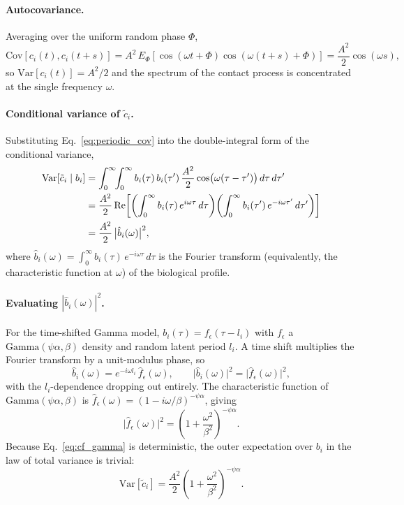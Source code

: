 \paragraph{Autocovariance.} Averaging over the uniform random phase $\Phi$,
%
\begin{equation}
	\text{Cov}[c_i(t), c_i(t+s)] = A^2\,E_\Phi[\cos(\omega t + \Phi)\cos(\omega(t+s) + \Phi)] = \frac{A^2}{2}\cos(\omega s),
	\label{eq:periodic_cov}
\end{equation}
%
so $\text{Var}[c_i(t)] = A^2/2$ and the spectrum of the contact process is concentrated at the single frequency $\omega$.

\paragraph{Conditional variance of $\tilde{c}_i$.} Substituting Eq.~\ref{eq:periodic_cov} into the double-integral form of the conditional variance,
%
\begin{align}
	\text{Var}[\tilde{c}_i \mid b_i]
	&= \int_0^\infty\!\!\int_0^\infty b_i(\tau)\,b_i(\tau')\,\frac{A^2}{2}\cos\bigl(\omega(\tau - \tau')\bigr)\,d\tau\,d\tau' \notag\\
	&= \frac{A^2}{2}\,\text{Re}\!\left[\left(\int_0^\infty b_i(\tau)\,e^{i\omega\tau}\,d\tau\right)\!\left(\int_0^\infty b_i(\tau')\,e^{-i\omega\tau'}\,d\tau'\right)\right] \notag\\
	&= \frac{A^2}{2}\,\bigl|\hat{b}_i(\omega)\bigr|^2,
	\label{eq:var_cond}
\end{align}
%
where $\hat{b}_i(\omega) = \int_0^\infty b_i(\tau)\,e^{-i\omega\tau}\,d\tau$ is the Fourier transform (equivalently, the characteristic function at $\omega$) of the biological profile.

\paragraph{Evaluating $|\hat{b}_i(\omega)|^2$.} For the time-shifted Gamma model, $b_i(\tau) = f_\epsilon(\tau - l_i)$ with $f_\epsilon$ a $\text{Gamma}(\psi\alpha, \beta)$ density and random latent period $l_i$. A time shift multiplies the Fourier transform by a unit-modulus phase, so
%
\begin{equation}
	\hat{b}_i(\omega) = e^{-i\omega l_i}\,\hat{f}_\epsilon(\omega), \qquad \bigl|\hat{b}_i(\omega)\bigr|^2 = \bigl|\hat{f}_\epsilon(\omega)\bigr|^2,
\end{equation}
%
with the $l_i$-dependence dropping out entirely. The characteristic function of $\text{Gamma}(\psi\alpha, \beta)$ is $\hat{f}_\epsilon(\omega) = (1 - i\omega/\beta)^{-\psi\alpha}$, giving
%
\begin{equation}
	\bigl|\hat{f}_\epsilon(\omega)\bigr|^2 = \left(1 + \frac{\omega^2}{\beta^2}\right)^{-\psi\alpha}.
	\label{eq:cf_gamma}
\end{equation}
%
Because Eq.~\ref{eq:cf_gamma} is deterministic, the outer expectation over $b_i$ in the law of total variance is trivial:
%
\begin{equation}
	\text{Var}[\tilde{c}_i] = \frac{A^2}{2}\left(1 + \frac{\omega^2}{\beta^2}\right)^{-\psi\alpha}.
	\label{eq:var_tildec}
\end{equation}

